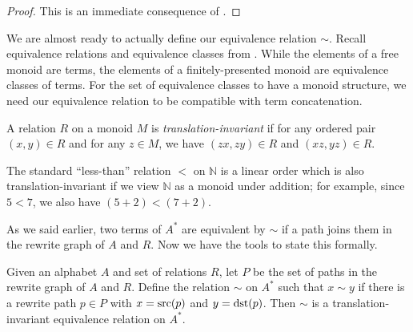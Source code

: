 \documentclass[../generics]{subfiles}
\begin{document}
\begin{proof}
This is an immediate consequence of .
\end{proof}

We are almost ready to actually define our equivalence relation $\sim$. Recall equivalence relations and equivalence classes from . While the elements of a free monoid are terms, the elements of a finitely-presented monoid are equivalence classes of terms. For the set of equivalence classes to have a monoid structure, we need our equivalence relation to be compatible with term concatenation.
\begin{definition}
%
A relation $R$ on a monoid $M$ is \emph{translation-invariant} if for any ordered pair $(x,y)\in R$ and for any $z\in M$, we have $(zx,zy)\in R$ and $(xz,yz)\in R$.
\end{definition}
\begin{example}
The standard ``less-than'' relation $<$ on $\mathbb{N}$ is a linear order which is also translation-invariant if we view $\mathbb{N}$ as a monoid under addition; for example, since $5<7$, we also have $(5+2)<(7+2)$.
\end{example}
As we said earlier, two terms of $A^*$ are equivalent by $\sim$ if a path joins them in the rewrite graph of $A$ and $R$. Now we have the tools to state this formally.
\begin{proposition}\label{monoid congruence}
Given an alphabet $A$ and set of relations $R$, let $P$ be the set of paths in the rewrite graph of $A$ and $R$. Define the relation \index{$\sim$}$\sim$ on $A^*$ such that $x\sim y$ if there is a rewrite path $p\in P$ with $x=\operatorname{src}(p)$ and $y=\operatorname{dst}(p)$. Then $\sim$ is a translation-invariant equivalence relation on $A^*$.
\end{proposition}
\end{document}
